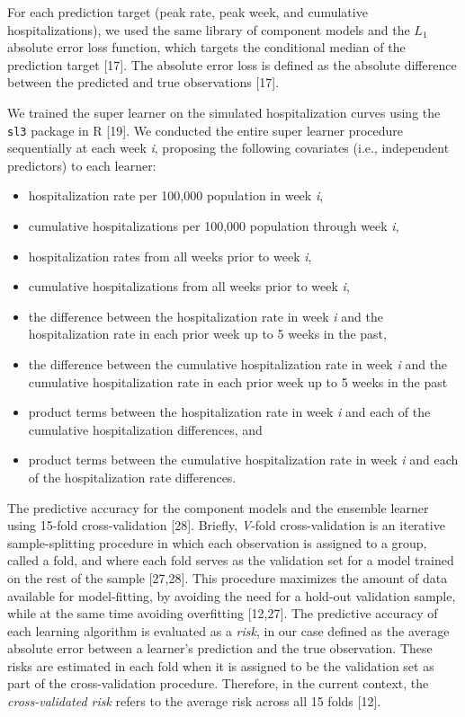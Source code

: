 \documentclass[10pt,letterpaper]{article}
\providecommand{\tightlist}{%
  \setlength{\itemsep}{0pt}\setlength{\parskip}{0pt}}
\begin{document}
For each prediction target (peak rate, peak week, and cumulative
hospitalizations), we used the same library of component models and the
\(L_1\) absolute error loss function, which targets the conditional
median of the prediction target {[}17{]}. The absolute error loss is
defined as the absolute difference between the predicted and true
observations {[}17{]}.

We trained the super learner on the simulated hospitalization curves
using the \texttt{sl3} package in R {[}19{]}. We conducted the entire
super learner procedure sequentially at each week \emph{i}, proposing
the following covariates (i.e., independent predictors) to each learner:

\begin{itemize}
\tightlist
\item
  hospitalization rate per 100,000 population in week \emph{i},
\item
  cumulative hospitalizations per 100,000 population through week
  \emph{i},
\item
  hospitalization rates from all weeks prior to week \emph{i},
\item
  cumulative hospitalizations from all weeks prior to week \emph{i},
\item
  the difference between the hospitalization rate in week \emph{i} and
  the hospitalization rate in each prior week up to 5 weeks in the past,
\item
  the difference between the cumulative hospitalization rate in week
  \emph{i} and the cumulative hospitalization rate in each prior week up
  to 5 weeks in the past
\item
  product terms between the hospitalization rate in week \emph{i} and
  each of the cumulative hospitalization differences, and
\item
  product terms between the cumulative hospitalization rate in week
  \emph{i} and each of the hospitalization rate differences.
\end{itemize}

The predictive accuracy for the component models and the ensemble
learner using 15-fold cross-validation {[}28{]}. Briefly, \emph{V}-fold
cross-validation is an iterative sample-splitting procedure in which
each observation is assigned to a group, called a fold, and where each
fold serves as the validation set for a model trained on the rest of the
sample {[}27,28{]}. This procedure maximizes the amount of data
available for model-fitting, by avoiding the need for a hold-out
validation sample, while at the same time avoiding overfitting
{[}12,27{]}. The predictive accuracy of each learning algorithm is
evaluated as a \emph{risk}, in our case defined as the average absolute
error between a learner's prediction and the true observation. These
risks are estimated in each fold when it is assigned to be the
validation set as part of the cross-validation procedure. Therefore, in
the current context, the \emph{cross-validated risk} refers to the
average risk across all 15 folds {[}12{]}.
\end{document}
